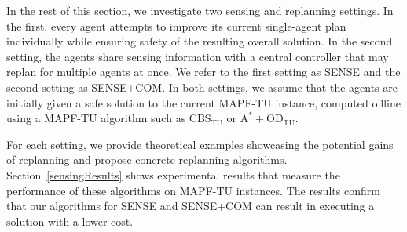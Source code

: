 \documentclass[jair,twoside,11pt,theapa]{article}
\newcommand{\odatu}{$\mathrm{A^{*}+OD_{TU}}$\xspace}
\newcommand{\cbstu}{CBS$\mathrm{_{TU}}$\xspace}
\newcommand{\mapftu}{MAPF-TU\xspace}
\newcommand{\sense}{SENSE\xspace}
\newcommand{\sensecom}{SENSE+COM\xspace}
\begin{document}
In the rest of this section, we investigate two sensing and replanning settings. 
In the first, every agent attempts to improve its current single-agent plan individually while ensuring safety of the resulting overall solution.
In the second setting, the agents share sensing information with a central controller that may replan for multiple agents at once. %
We refer to the first setting as \sense and the second setting as \sensecom. 
In both settings, we assume that the agents are initially given a safe solution to the current \mapftu instance, computed offline using a \mapftu algorithm such as \cbstu or \odatu. 

For each setting, we provide theoretical examples showcasing the potential gains of  replanning and propose concrete replanning algorithms. 
Section~\ref{sensingResults} shows experimental results that measure the performance of these algorithms on \mapftu instances. The results confirm that our algorithms for \sense and \sensecom can result in executing a solution with a lower cost.


 







\end{document}
